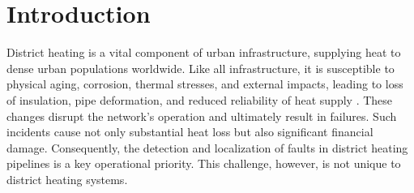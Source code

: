 \documentclass[energies,article,submit,pdftex,moreauthors]{Definitions/mdpi}
\begin{document}


\section{Introduction}



District heating is a vital component of urban infrastructure, supplying heat
to dense urban populations worldwide. Like all infrastructure, it is
susceptible to physical aging, corrosion, thermal stresses, and external
impacts, leading to loss of insulation, pipe deformation, and reduced
reliability of heat supply \cite{novitsky2022intellectualization,
	tereshchenko2016importance, POSTNIKOV2020293}. These changes disrupt the
network's operation and ultimately result in failures. Such incidents cause not
only substantial heat loss but also significant financial damage. Consequently,
the detection and localization of faults in district heating
	pipelines is a key operational priority. This challenge, however, is not
unique to district heating systems.
\end{document}
